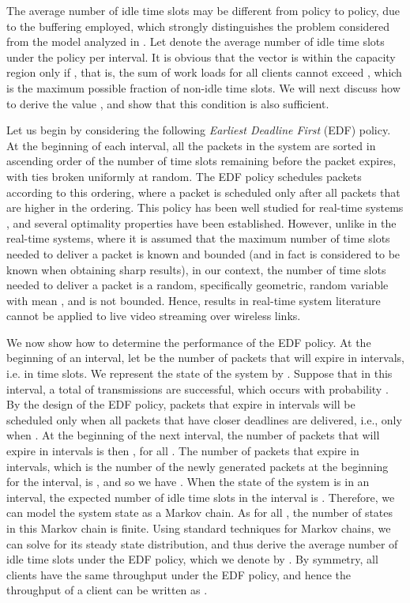 \documentclass[10pt,nocopyrightspace]{sigplan-proc-varsize-1in}
\begin{document}
The average number of idle time slots may be different from policy to policy, due to the buffering employed, which strongly distinguishes the problem considered from the model analyzed in \cite{IH09}. Let  denote the average number of idle time slots under the policy  per interval. It is obvious that the vector  is within the capacity region only if , that is, the sum of work loads for all clients cannot exceed , which is the maximum possible fraction of non-idle time slots. We will next discuss how to derive the value , and show that this condition is also sufficient.

Let us begin by considering the following \emph{Earliest Deadline First} (EDF) policy. At the beginning of each interval, all the packets in the system are sorted in ascending order of the number of time slots remaining before the packet expires, with ties broken uniformly at random. The EDF policy schedules packets according to this ordering, where a packet is scheduled only after all packets that are higher in the ordering. This policy has been well studied for real-time systems \cite{CLL73}, and several optimality properties have been established. However, unlike in the real-time systems, where it is assumed that the maximum number of time slots needed to deliver a packet is known and bounded (and in fact is considered to be known when obtaining sharp results), in our context, the number of time slots needed to deliver a packet is a random, specifically geometric, random variable with mean , and is not bounded. Hence, results in real-time system literature cannot be applied to live video streaming over wireless links.

We now show how to determine the performance of the EDF policy. At the beginning of an interval, let  be the number of packets that will expire in  intervals, i.e. in  time slots. We represent the state of the system by . Suppose that in this interval, a total of  transmissions are successful, which occurs with probability . By the design of the EDF policy, packets that expire in  intervals will be scheduled only when all packets that have closer deadlines are delivered, i.e., only when . At the beginning of the next interval, the number of packets that will expire in  intervals is then , for all . The number of packets that expire in  intervals, which is the number of the newly generated packets at the beginning for the interval, is , and so we have . When the state of the system is  in an interval, the expected number of idle time slots in the interval is . Therefore, we can model the system state  as a Markov chain. As  for all , the number of states in this Markov chain is finite. Using standard techniques for Markov chains, we can solve for its steady state distribution, and thus derive the average number of idle time slots under the EDF policy, which we denote by . By symmetry, all clients have the same throughput under the EDF policy, and hence the throughput of a client can be written as .
\end{document}

